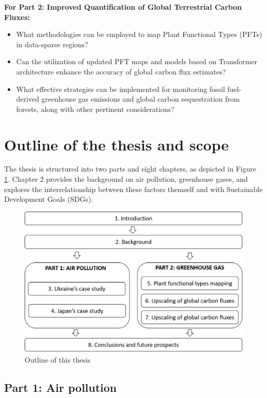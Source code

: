 \textbf{For Part 2: Improved Quantification of Global Terrestrial Carbon Fluxes:}
\begin{itemize}
    \item What methodologies can be employed to map Plant Functional Types (PFTs) in data-sparse regions?
    \item Can the utilization of updated PFT maps and models based on Transformer architecture enhance the accuracy of global carbon flux estimates?
    \item What effective strategies can be implemented for monitoring fossil fuel-derived greenhouse gas emissions and global carbon sequestration from forests, along with other pertinent considerations?
\end{itemize}

\section{Outline of the thesis and scope}

The thesis is structured into two parts and eight chapters, as depicted in Figure \ref{fig:chap1_fig1}. Chapter 2 provides the background on air pollution, greenhouse gases, and explores the interrelationship between these factors themself and with Sustainable Development Goals (SDGs). \par
\begin{figure}[tbh!]
    \centering
    \includegraphics[width=\textwidth]{figs/chap1/outline.png}
    \caption{Outline of this thesis}
    \label{fig:chap1_fig1}
\end{figure}
\subsection*{Part 1: Air pollution}

